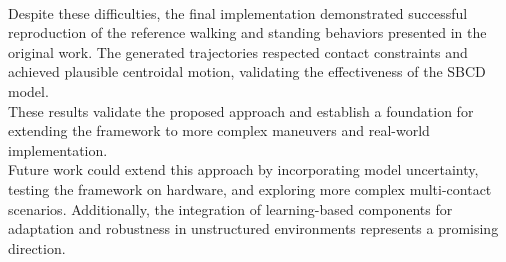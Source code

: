 \documentclass[main.tex]{subfiles}
\begin{document}
\begin{sloppypar}
    \\Despite these difficulties, the final implementation demonstrated successful reproduction of the reference walking and standing behaviors presented in the original work. The generated trajectories respected contact constraints and achieved plausible centroidal motion, validating the effectiveness of the SBCD model.
    \\These results validate the proposed approach and establish a foundation for extending the framework to more complex maneuvers and real-world implementation.
    \\Future work could extend this approach by incorporating model uncertainty, testing the framework on hardware, and exploring more complex multi-contact scenarios. Additionally, the integration of learning-based components for adaptation and robustness in unstructured environments represents a promising direction.
\end{sloppypar}
\end{document}
